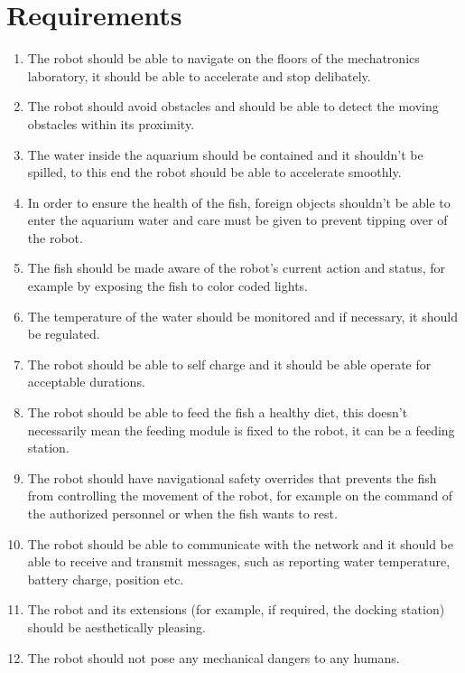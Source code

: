 \documentclass[12pt]{article}
\begin{document}
\section{Requirements}
	\begin{enumerate}
		\item The robot should be able to navigate on the floors of the mechatronics laboratory, it should be able to accelerate and stop delibately.
		\item The robot should avoid obstacles and should be able to detect the moving obstacles within its proximity.
		\item The water inside the aquarium should be contained and it shouldn't be spilled, to this end the robot should be able to accelerate smoothly.
		\item In order to ensure the health of the fish, foreign objects shouldn't be able to enter the aquarium water and care must be given to prevent tipping over of the robot.
		\item The fish should be made aware of the robot's current action and status, for example by exposing the fish to color coded lights.
		\item The temperature of the water should be monitored and if necessary, it should be regulated.
		\item The robot should be able to self charge and it should be able operate for acceptable durations.
		\item The robot should be able to feed the fish a healthy diet, this doesn't necessarily mean the feeding module is fixed to the robot, it can be a feeding station.
		\item The robot should have navigational safety overrides that prevents the fish from controlling the movement of the robot, for example on the command of the authorized personnel or when the fish wants to rest.
		\item The robot should be able to communicate with the network and it should be able to receive and transmit messages, such as reporting water temperature, battery charge, position etc.
		\item The robot and its extensions (for example, if required, the docking station) should be aesthetically pleasing.
		\item The robot should not pose any mechanical dangers to any humans.
	\end{enumerate}

\end{document}
